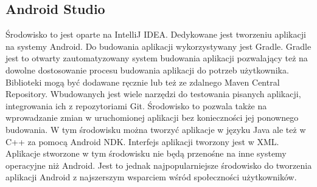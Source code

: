 \documentclass[eng]{mgr}
\begin{document}
			\subsection{Android Studio}
			Środowisko to jest oparte na IntelliJ IDEA. Dedykowane jest tworzeniu aplikacji na systemy Android. Do budowania aplikacji wykorzystywany jest Gradle. Gradle jest to otwarty zautomatyzowany system budowania aplikacji pozwalający też na dowolne dostosowanie procesu budowania aplikacji do potrzeb użytkownika. Biblioteki mogą być dodawane ręcznie lub też ze zdalnego Maven Central Repository. Wbudowanych jest wiele narzędzi do testowania pisanych aplikacji, integrowania ich z repozytoriami Git. Środowisko to pozwala także na wprowadzanie zmian w uruchomionej aplikacji bez konieczności jej ponownego budowania. W tym środowisku można tworzyć aplikacje w języku Java ale też w C++ za pomocą Android NDK. Interfejs aplikacji tworzony jest w XML. Aplikacje stworzone w tym środowisku nie będą przenośne na inne systemy operacyjne niż Android. Jest to jednak najpopularniejsze środowisko do tworzenia aplikacji Android z najszerszym wsparciem wśród społeczności użytkowników.
			
\end{document}
